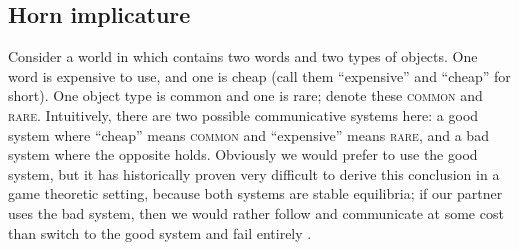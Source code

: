 \documentclass{article} %
\begin{document}
%
%

\subsection{Horn implicature}

\label{sec:horn-implicature}


Consider a world in which contains two words and two types of objects. One word is expensive to use, and one is cheap (call them ``expensive'' and ``cheap'' for short). One object type is common and one is rare; denote these \textsc{common} and \textsc{rare}. Intuitively, there are two possible communicative systems here: a good system where ``cheap'' means \textsc{common} and ``expensive'' means \textsc{rare}, and a bad system where the opposite holds. Obviously we would prefer to use the good system, but it has historically proven very difficult to derive this conclusion in a game theoretic setting, because both systems are stable equilibria; if our partner uses the bad system, then we would rather follow and communicate at some cost than switch to the good system and fail entirely \cite{bergen2012}.
\end{document}
